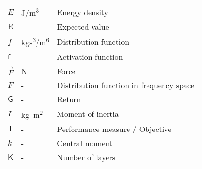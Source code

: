 \begin{longtable}{p{5cm}p{4cm}p{5cm}}
    $E$                     & \si{J/m\cubed}  & Energy density \\
    $\mathrm{E}$			& \si{-}		& Expected value \\
    $f$						& \si{kgs\cubed/m\tothe{6}} & Distribution function \\
    $\mathsf{f}$			& \si{-}		& Activation function \\
    $\vec{F}$				& \si{N}		& Force \\
    $F$						& \si{-}		& Distribution function in frequency space \\
    $\mathsf{G}$			& \si{-}		& Return \\
    $I$						& \si{kg m\squared} & Moment of inertia \\
    $\mathsf{J}$			& \si{-}		& Performance measure / Objective \\
    $k$						& \si{-}		& Central moment \\
    $\mathsf{K}$			& \si{-}		& Number of layers \\

\end{longtable}
